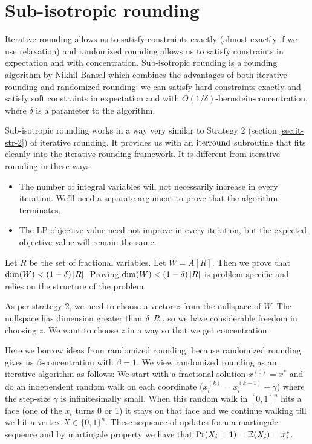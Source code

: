 \section{Sub-isotropic rounding}

Iterative rounding allows us to satisfy constraints exactly
(almost exactly if we use relaxation) and randomized rounding allows us to
satisfy constraints in expectation and with concentration.
Sub-isotropic rounding is a rounding algorithm by Nikhil Bansal
which combines the advantages of both iterative rounding and randomized rounding:
we can satisfy hard constraints exactly and satisfy soft constraints
in expectation and with $O(1/\delta)$-bernstein-concentration,
where $\delta$ is a parameter to the algorithm.

Sub-isotropic rounding works in a way very similar to
Strategy 2 (section \ref{sec:it-str-2}) of iterative rounding.
It provides us with an $\operatorname{iterround}$ subroutine
that fits cleanly into the iterative rounding framework.
It is different from iterative rounding in these ways:
\begin{itemize}
\item The number of integral variables will not necessarily increase in every iteration.
We'll need a separate argument to prove that the algorithm terminates.
\item The LP objective value need not improve in every iteration,
but the expected objective value will remain the same.
\end{itemize}

Let $R$ be the set of fractional variables. Let $W = A[R]$.
Then we prove that $\dim(W) < (1-\delta)\left\lvert R \right\rvert$.
Proving $\dim(W) < (1-\delta)\left\lvert R \right\rvert$ is problem-specific
and relies on the structure of the problem.

As per strategy 2, we need to choose a vector $z$ from the nullspace of $W$.
The nullspace has dimension greater than $\delta\left\lvert R \right\rvert$,
so we have considerable freedom in choosing $z$.
We want to choose $z$ in a way so that we get concentration.

Here we borrow ideas from randomized rounding,
because randomized rounding gives us $\beta$-concentration with $\beta = 1$.
We view randomized rounding as an iterative algorithm as follows:
We start with a fractional solution $x^{(0)} = x^*$ and do an independent random walk
on each coordinate ($x_i^{(k)} = x_i^{(k-1)} + \gamma$)
where the step-size $\gamma$ is infinitesimally small.
When this random walk in $[0,1]^n$ hits a face (one of the $x_i$ turns 0 or 1)
it stays on that face and we continue walking till we hit a vertex $X \in \{0, 1\}^n$.
These sequence of updates form a martingale sequence and by martingale property
we have that $\Pr(X_i = 1) = \operatorname{\mathbb{E}}(X_i) = x_i^*$.

